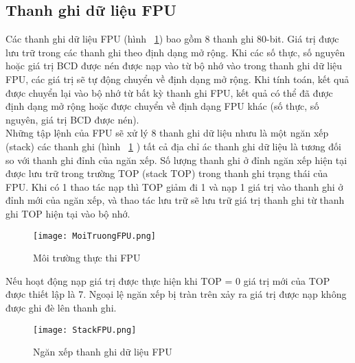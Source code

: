 		\subsection*{Thanh ghi dữ liệu FPU}
	Các thanh ghi dữ liệu FPU (hình ~\ref{fig:MoiTruongFPU}) bao gồm 8 thanh ghi 80-bit. Giá trị được lưu trữ trong các thanh ghi theo định dạng mở rộng. Khi các số thực, số nguyên hoặc giá trị BCD được nén được nạp vào từ bộ nhớ vào trong thanh ghi dữ liệu FPU, các giá trị sẽ tự động chuyển về định dạng mở rộng. Khi tính toán, kết quả được chuyển lại vào bộ nhớ từ bất kỳ thanh ghi FPU, kết quả có thể đã được định dạng mở rộng hoặc được chuyển về định dạng FPU khác (số thực, số nguyên, giá trị BCD được nén).\\	

	Những tập lệnh của FPU sẽ xử lý 8 thanh ghi dữ liệu nhưu là một ngăn xếp (stack) các thanh ghi (hình ~\ref{fig:MoiTruongFPU} ) tất cả địa chỉ ác thanh ghi dữ liệu là tương đối so với thanh ghi đỉnh của ngăn xếp. Số lượng thanh ghi ở đỉnh ngăn xếp hiện tại được lưu trữ trong trường TOP (stack TOP) trong thanh ghi trạng thái của FPU. Khi có 1 thao tác nạp thì TOP giảm đi 1 và nạp 1 giá trị vào thanh ghi ở đỉnh mới của ngăn xếp, và thao tác lưu trữ sẽ lưu trữ giá trị thanh ghi từ thanh ghi TOP hiện tại vào bộ nhớ.
		
		\begin{center}
			\begin{figure}[htp]
				\begin{center}
					\texttt{[image: MoiTruongFPU.png]}
				\end{center}
				\caption{Môi trường thực thi FPU \protect\footnotemark}				
				\label{fig:MoiTruongFPU}				
			\end{figure}
		\end{center}		
	
	\newpage	
	Nếu hoạt động nạp giá trị được thực hiện khi TOP = 0 giá trị mới của TOP được thiết lập là 7. Ngoại lệ ngăn xếp bị tràn trên xảy ra giá trị được nạp không được ghi đè lên thanh ghi.			
			\begin{center}
			\begin{figure}[htp]
				\begin{center}
					\texttt{[image: StackFPU.png]}
				\end{center}
				\caption{Ngăn xếp thanh ghi dữ liệu FPU }				
				\label{fig:StackFPU}				
			\end{figure}
		\end{center}		
			
